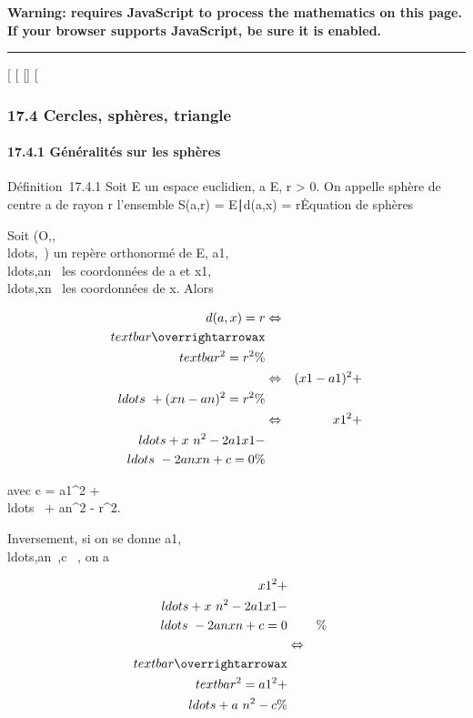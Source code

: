 \textbf{Warning: 
requires JavaScript to process the mathematics on this page.\\ If your
browser supports JavaScript, be sure it is enabled.}

\begin{center}\rule{3in}{0.4pt}\end{center}

{[}
{[}
{[}{]}
{[}

\subsubsection{17.4 Cercles, sphères, triangle}

\paragraph{17.4.1 Généralités sur les sphères}

Définition~17.4.1 Soit E un espace euclidien, a \in E, r \textgreater{} 0.
On appelle sphère de centre a de rayon r l'ensemble S(a,r) =
\x \in E∣d(a,x) =
r\.

Equation de sphères

Soit
(O,,\\ldots,\vecen~)
un repère orthonormé de E,
a1,\\ldots,an~
les coordonnées de a et
x1,\\ldots,xn~
les coordonnées de x. Alors

\begin{align*} d(a,x) = r&
\Leftrightarrow &
\\textbar{}\overrightarrowax\\textbar{}^2
= r^2 \%& \\ &
\Leftrightarrow & (x1 -
a1)^2 +
\\ldots~ +
(x n - an)^2 = r^2 \%&
\\ & \Leftrightarrow &
x1^2 +
\\ldots + x~
n^2 - 2a 1x1
-\\ldots~ -
2anxn + c = 0\%& \\
\end{align*}

avec c = a1^2 +
\\ldots~ +
an^2 - r^2.

Inversement, si on se donne
a1,\\ldots,an~,c
\in {}~, on a

\begin{align*} x1^2 +
\\ldots + x~
n^2 - 2a 1x1
-\\ldots~ -
2anxn + c = 0&&\%&
\\ & \Leftrightarrow &
\\textbar{}\overrightarrowax\\textbar{}^2
= a 1^2 +
\\ldots + a~
n^2 - c\%& \\
\end{align*}

